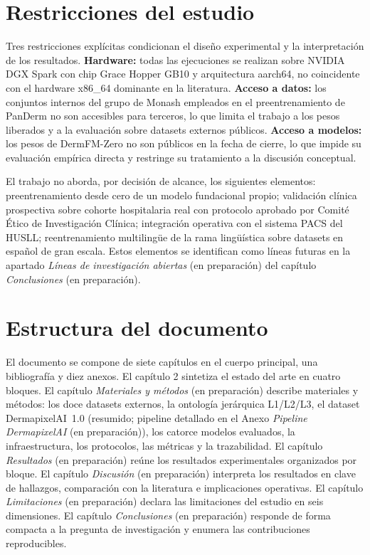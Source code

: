 \section{Restricciones del estudio}
\label{sec:alcance}

Tres restricciones explícitas condicionan el diseño experimental y
la interpretación de los resultados. \textbf{Hardware:} todas las
ejecuciones se realizan sobre NVIDIA DGX Spark con chip Grace
Hopper GB10 y arquitectura aarch64, no coincidente con el hardware
x86\_64 dominante en la literatura. \textbf{Acceso a datos:} los
conjuntos internos del grupo de Monash empleados en el
preentrenamiento de PanDerm no son accesibles para terceros, lo que
limita el trabajo a los pesos liberados y a la evaluación sobre
datasets externos públicos. \textbf{Acceso a modelos:} los pesos
de DermFM-Zero no son públicos en la fecha de cierre, lo que impide
su evaluación empírica directa y restringe su tratamiento a la
discusión conceptual.

El trabajo no aborda, por decisión de alcance, los siguientes
elementos: preentrenamiento desde cero de un modelo fundacional
propio; validación clínica prospectiva sobre cohorte hospitalaria
real con protocolo aprobado por Comité Ético de Investigación
Clínica; integración operativa con el sistema PACS del HUSLL;
reentrenamiento multilingüe de la rama lingüística sobre datasets en
español de gran escala. Estos elementos se identifican como líneas
futuras en la apartado \emph{Líneas de investigación abiertas} (en preparación) del
capítulo \emph{Conclusiones} (en preparación).

\section{Estructura del documento}
\label{sec:estructura}

El documento se compone de siete capítulos en el cuerpo principal,
una bibliografía y diez anexos. El capítulo 2 sintetiza
el estado del arte en cuatro bloques. El
capítulo \emph{Materiales y métodos} (en preparación) describe materiales y métodos: los doce
datasets externos, la ontología jerárquica L1/L2/L3, el dataset
DermapixelAI~1.0 (resumido; pipeline detallado en el
Anexo \emph{Pipeline DermapixelAI} (en preparación)), los catorce modelos evaluados, la
infraestructura, los protocolos, las métricas y la trazabilidad. El
capítulo \emph{Resultados} (en preparación) reúne los resultados experimentales
organizados por bloque. El capítulo \emph{Discusión} (en preparación) interpreta
los resultados en clave de hallazgos, comparación con la literatura
e implicaciones operativas. El capítulo \emph{Limitaciones} (en preparación)
declara las limitaciones del estudio en seis dimensiones. El
capítulo \emph{Conclusiones} (en preparación) responde de forma compacta a la
pregunta de investigación y enumera las contribuciones
reproducibles.

